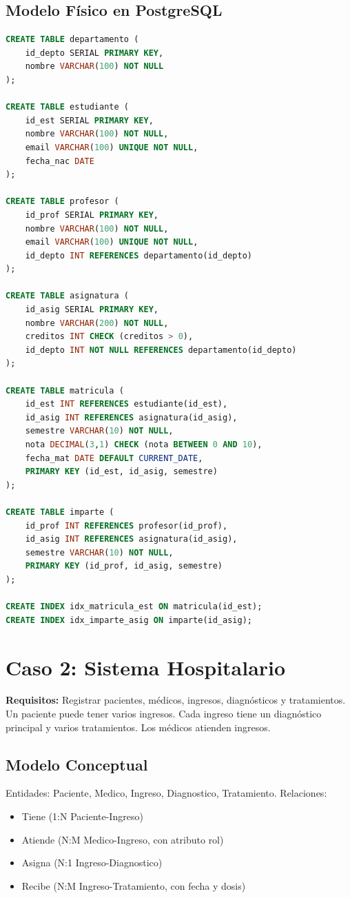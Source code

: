 \documentclass[12pt,a4paper,openany,oneside]{book}
\begin{document}
\subsection{Modelo Físico en PostgreSQL}
\begin{lstlisting}[language=SQL]
CREATE TABLE departamento (
    id_depto SERIAL PRIMARY KEY,
    nombre VARCHAR(100) NOT NULL
);

CREATE TABLE estudiante (
    id_est SERIAL PRIMARY KEY,
    nombre VARCHAR(100) NOT NULL,
    email VARCHAR(100) UNIQUE NOT NULL,
    fecha_nac DATE
);

CREATE TABLE profesor (
    id_prof SERIAL PRIMARY KEY,
    nombre VARCHAR(100) NOT NULL,
    email VARCHAR(100) UNIQUE NOT NULL,
    id_depto INT REFERENCES departamento(id_depto)
);

CREATE TABLE asignatura (
    id_asig SERIAL PRIMARY KEY,
    nombre VARCHAR(200) NOT NULL,
    creditos INT CHECK (creditos > 0),
    id_depto INT NOT NULL REFERENCES departamento(id_depto)
);

CREATE TABLE matricula (
    id_est INT REFERENCES estudiante(id_est),
    id_asig INT REFERENCES asignatura(id_asig),
    semestre VARCHAR(10) NOT NULL,
    nota DECIMAL(3,1) CHECK (nota BETWEEN 0 AND 10),
    fecha_mat DATE DEFAULT CURRENT_DATE,
    PRIMARY KEY (id_est, id_asig, semestre)
);

CREATE TABLE imparte (
    id_prof INT REFERENCES profesor(id_prof),
    id_asig INT REFERENCES asignatura(id_asig),
    semestre VARCHAR(10) NOT NULL,
    PRIMARY KEY (id_prof, id_asig, semestre)
);

CREATE INDEX idx_matricula_est ON matricula(id_est);
CREATE INDEX idx_imparte_asig ON imparte(id_asig);
\end{lstlisting}

\section{Caso 2: Sistema Hospitalario}
\textbf{Requisitos:} Registrar pacientes, médicos, ingresos, diagnósticos y tratamientos. Un paciente puede tener varios ingresos. Cada ingreso tiene un diagnóstico principal y varios tratamientos. Los médicos atienden ingresos.

\subsection{Modelo Conceptual}
Entidades: Paciente, Medico, Ingreso, Diagnostico, Tratamiento.
Relaciones:
\begin{itemize}
    \item Tiene (1:N Paciente-Ingreso)
    \item Atiende (N:M Medico-Ingreso, con atributo rol)
    \item Asigna (N:1 Ingreso-Diagnostico)
    \item Recibe (N:M Ingreso-Tratamiento, con fecha y dosis)
\end{itemize}
\end{document}
